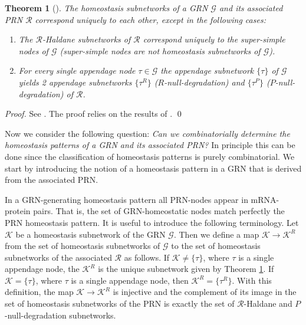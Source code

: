 \documentclass[a4paper,fleqn]{cas-dc}
\newcommand{\II}{{\mathcal I}}
\newtheorem{theorem}{Theorem}[section]
\newcommand{\END}{\hfill\mbox{\raggedright \mbox{\raisebox{2pt}{\scalebox{0.6}{$\Diamond$}}}}\medskip}
\begin{document}
\begin{theorem}[{\cite[Theorem 2.5]{antoneli2023}}] \label{thm:main1}
The homeostasis subnetworks of a GRN $\mathcal{G}$ and its associated PRN $\mathcal{R}$ correspond uniquely to each other, except in the following cases:
\begin{enumerate}[{\rm (a)}]
\item The $\mathcal{R}$-Haldane subnetworks of $\mathcal{R}$ correspond uniquely to the super-simple nodes of $\mathcal{G}$ (super-simple nodes are not homeostasis subnetworks of $\mathcal{G}$).
\item For every single appendage node $\tau\in\mathcal{G}$ the appendage subnetwork $\{\tau\}$ of $\mathcal{G}$ yields 2 appendage subnetworks $\{\tau^R\}$ ($R$-null-degradation) and $\{\tau^P\}$ ($P$-null-degradation) of $\mathcal{R}$.
\end{enumerate}
\end{theorem}
\begin{proof}
See \cite[Sec. B]{antoneli2023}.
The proof relies on the results of \cite{wang2021}.
\qed
\end{proof}

Now we consider the following question: {\em Can we combinatorially determine the homeostasis patterns of a GRN and its associated PRN?}
In principle this can be done since the classification of homeostasis patterns is purely combinatorial.
We start by introducing the notion of a homeostasis pattern in a GRN that is derived from the associated PRN.


In a GRN-generating homeostasis pattern all PRN-nodes appear in mRNA-protein pairs.
That is, the set of GRN-homeostatic nodes match perfectly the PRN homeostasis pattern.
It is useful to introduce the following terminology.
Let $\mathcal{K}$ be a homeostasis subnetwork of the GRN $\mathcal{G}$.
Then we define a map $\mathcal{K}\to\mathcal{K}^R$ from the set of homeostasis subnetworks of $\mathcal{G}$ to the set of homeostasis subnetworks of the associated $\mathcal{R}$ as follows.
If $\mathcal{K}\neq\{\tau\}$, where $\tau$ is a single appendage node, the $\mathcal{K}^R$ is the unique subnetwork given by Theorem \ref{thm:main1}.
If $\mathcal{K}=\{\tau\}$, where $\tau$ is a single appendage node, then $\mathcal{K}^R=\{\tau^R\}$.
With this definition, the map $\mathcal{K}\to\mathcal{K}^R$ is injective and the complement of its image in the set of homeostasis subnetworks of the PRN is exactly the set of $\mathcal{R}$-Haldane and $P$-null-degradation subnetworks.
\end{document}
